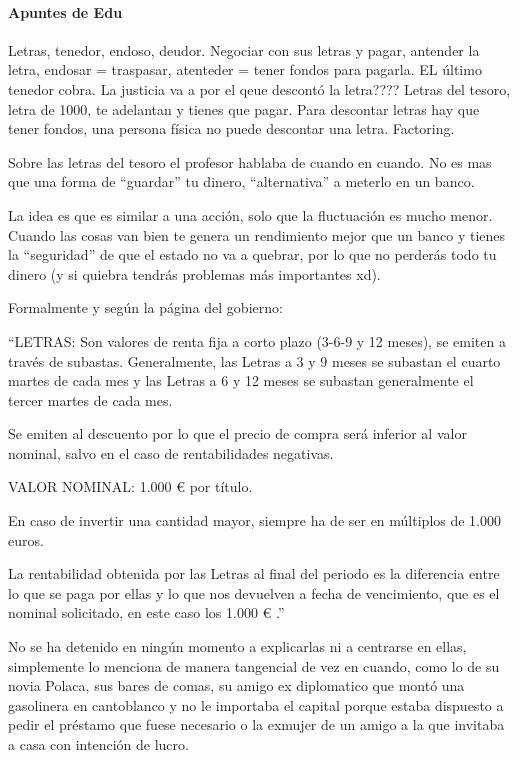 \documentclass[nochap,palatino,shortheader]{apuntes}
\begin{document}
\paragraph{Apuntes de Edu}
Letras, tenedor, endoso, deudor. Negociar con sus letras y pagar, antender la letra, endosar = traspasar, atenteder = tener fondos para pagarla. EL último tenedor cobra. La justicia va a por el qeue descontó la letra????  Letras del tesoro, letra de 1000, te adelantan y tienes que pagar. Para descontar letras hay que tener fondos, una persona física no puede descontar una letra. Factoring.

\color{blue}

Sobre las letras del tesoro el profesor hablaba de cuando en cuando. No es mas que una forma de ``guardar'' tu dinero, ``alternativa'' a meterlo en un banco.

La idea es que es similar a una acción, solo que la fluctuación es mucho menor. Cuando las cosas van bien te genera un rendimiento mejor que un banco y tienes la ``seguridad'' de que el estado no va a quebrar, por lo que no perderás todo tu dinero (y si quiebra tendrás problemas más importantes xd).

Formalmente y según la página del gobierno:

``LETRAS: Son valores de renta fija a corto plazo (3-6-9 y 12 meses), se emiten a través de subastas. Generalmente, las Letras a 3 y 9 meses se subastan el cuarto martes de cada mes y las Letras a 6 y 12 meses se subastan generalmente el tercer martes de cada mes.

Se emiten al descuento por lo que el precio de compra será inferior al valor nominal, salvo en el caso de rentabilidades negativas.

VALOR NOMINAL: 1.000 € por título.

En caso de invertir una cantidad mayor, siempre ha de ser en múltiplos de 1.000 euros.

La rentabilidad obtenida por las Letras al final del periodo es la diferencia entre lo que se paga por ellas y lo que nos devuelven a fecha de vencimiento, que es el nominal solicitado, en este caso los 1.000 € .''

No se ha detenido en ningún momento a explicarlas ni a centrarse en ellas, simplemente lo menciona de manera tangencial de vez en cuando, como lo de su novia Polaca, sus bares de comas, su amigo ex diplomatico que montó una gasolinera en cantoblanco y no le importaba el capital porque estaba dispuesto a pedir el préstamo que fuese necesario o la exmujer de un amigo a la que invitaba a casa con intención de lucro.
\end{document}
